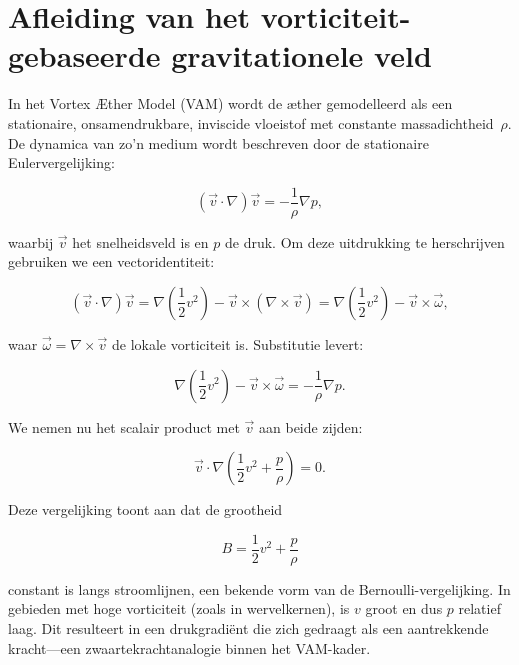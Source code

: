 
\section{Afleiding van het vorticiteit-gebaseerde gravitationele veld}

In het Vortex Æther Model (VAM) wordt de æther gemodelleerd als een stationaire, onsamendrukbare, inviscide vloeistof met constante massadichtheid~$\rho$. De dynamica van zo'n medium wordt beschreven door de stationaire Eulervergelijking:

\begin{equation}
(\vec{v} \cdot \nabla)\vec{v} = -\frac{1}{\rho} \nabla p,
\end{equation}

waarbij $\vec{v}$ het snelheidsveld is en $p$ de druk. Om deze uitdrukking te herschrijven gebruiken we een vectoridentiteit:

\begin{equation}
(\vec{v} \cdot \nabla)\vec{v} = \nabla\left(\frac{1}{2}v^2\right) - \vec{v} \times (\nabla \times \vec{v}) = \nabla\left(\frac{1}{2}v^2\right) - \vec{v} \times \vec{\omega},
\end{equation}

waar $\vec{\omega} = \nabla \times \vec{v}$ de lokale vorticiteit is. Substitutie levert:

\begin{equation}
\nabla\left(\frac{1}{2}v^2\right) - \vec{v} \times \vec{\omega} = -\frac{1}{\rho} \nabla p.
\end{equation}

We nemen nu het scalair product met $\vec{v}$ aan beide zijden:

\begin{equation}
\vec{v} \cdot \nabla\left(\frac{1}{2}v^2 + \frac{p}{\rho}\right) = 0.
\end{equation}

Deze vergelijking toont aan dat de grootheid

\begin{equation}
B = \frac{1}{2}v^2 + \frac{p}{\rho}
\end{equation}

constant is langs stroomlijnen, een bekende vorm van de Bernoulli-vergelijking. In gebieden met hoge vorticiteit (zoals in wervelkernen), is $v$ groot en dus $p$ relatief laag. Dit resulteert in een drukgradiënt die zich gedraagt als een aantrekkende kracht—een zwaartekrachtanalogie binnen het VAM-kader.

